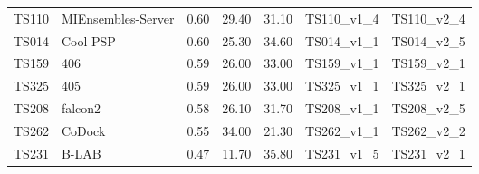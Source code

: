 \begin{table}[ht]
{\begin{tabular}{llrrrll}
TS110 & MIEnsembles-Server & 0.60 & 29.40 & 31.10 & TS110\_v1\_4 & TS110\_v2\_4 \\ 
TS014 & Cool-PSP & 0.60 & 25.30 & 34.60 & TS014\_v1\_1 & TS014\_v2\_5 \\ 
TS159 & 406 & 0.59 & 26.00 & 33.00 & TS159\_v1\_1 & TS159\_v2\_1 \\ 
TS325 & 405 & 0.59 & 26.00 & 33.00 & TS325\_v1\_1 & TS325\_v2\_1 \\ 
TS208 & falcon2 & 0.58 & 26.10 & 31.70 & TS208\_v1\_1 & TS208\_v2\_5 \\ 
TS262 & CoDock & 0.55 & 34.00 & 21.30 & TS262\_v1\_1 & TS262\_v2\_2 \\ 
TS231 & B-LAB & 0.47 & 11.70 & 35.80 & TS231\_v1\_5 & TS231\_v2\_1 \\ 
\bottomrule
\end{tabular}%
}
\end{table}
